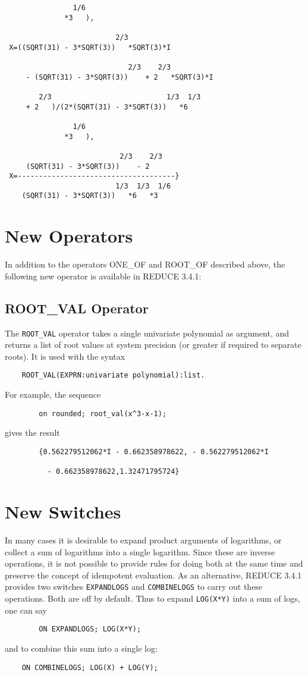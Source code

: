\begin{verbatim}
                1/6
              *3   ),

                          2/3
 X=((SQRT(31) - 3*SQRT(3))   *SQRT(3)*I

                             2/3    2/3
     - (SQRT(31) - 3*SQRT(3))    + 2   *SQRT(3)*I

        2/3                           1/3  1/3
     + 2   )/(2*(SQRT(31) - 3*SQRT(3))   *6

                1/6
              *3   ),

                           2/3    2/3
     (SQRT(31) - 3*SQRT(3))    - 2
 X=-------------------------------------}
                          1/3  1/3  1/6
    (SQRT(31) - 3*SQRT(3))   *6   *3

\end{verbatim}
\newpage
\section{New Operators}

In addition to the operators ONE\_OF and ROOT\_OF described above, the
following new operator is available in REDUCE 3.4.1:

\subsection{ROOT\_VAL Operator}

The {\tt ROOT\_VAL} operator takes a single univariate polynomial as
argument, and returns a list of root values at system precision (or
greater if required to separate roots).  It is used with the syntax
\begin{verbatim}
	ROOT_VAL(EXPRN:univariate polynomial):list.
\end{verbatim}
For example, the sequence
\begin{verbatim}
        on rounded; root_val(x^3-x-1);
\end{verbatim}
gives the result
\begin{verbatim}
        {0.562279512062*I - 0.662358978622, - 0.562279512062*I

          - 0.662358978622,1.32471795724}
\end{verbatim}

\section{New Switches}
In many cases it is desirable to expand product arguments of logarithms, or
collect a sum of logarithms into a single logarithm.  Since these are inverse
operations, it is not possible to provide rules for doing both at the same
time and preserve the {\REDUCE} concept of idempotent evaluation. As an
alternative, REDUCE 3.4.1 provides two switches {\tt EXPANDLOGS} and
{\tt COMBINELOGS} to carry out these operations.  Both are off by default.
Thus to expand {\tt LOG(X*Y)} into a sum of logs, one can say
\begin{verbatim}
        ON EXPANDLOGS; LOG(X*Y);
\end{verbatim}
and to combine this sum into a single log:
\begin{verbatim}
	ON COMBINELOGS; LOG(X) + LOG(Y);
\end{verbatim}


